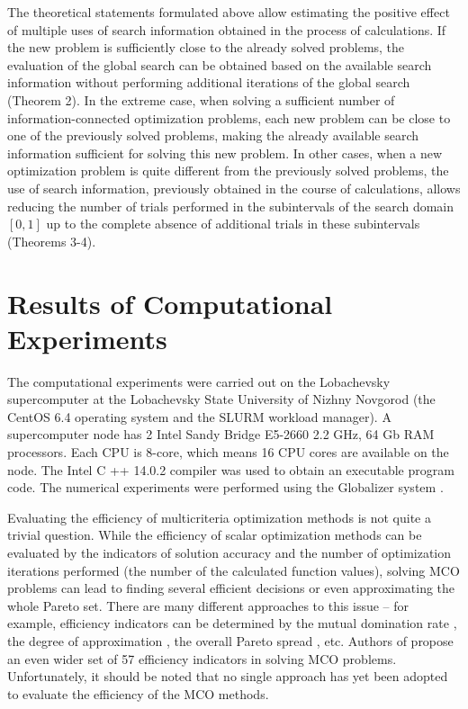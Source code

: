 \documentclass[smallextended]{svjour3}       %
\begin{document}
The theoretical statements formulated above allow estimating the positive effect of multiple uses of search information obtained in the process of calculations. If the new problem is sufficiently close to the already solved problems, the evaluation of the global search can be obtained based on the available search information without performing additional iterations of the global search (Theorem 2). In the extreme case, when solving a sufficient number of information-connected optimization problems, each new problem can be close to one of the previously solved problems, making the already available search information sufficient for solving this new problem. In other cases, when a new optimization problem is quite different from the previously solved problems, the use of search information, previously obtained in the course of calculations, allows reducing the number of trials performed in the subintervals of the search domain $[0,1]$ up to the complete absence of additional trials in these subintervals (Theorems 3-4).

\section{Results of Computational Experiments}
\label{sec:5}

The computational experiments were carried out on the Lobachevsky supercomputer at the Lobachevsky State University of Nizhny Novgorod (the CentOS 6.4 operating system and the SLURM workload manager). A supercomputer node has 2 Intel Sandy Bridge E5-2660 2.2 GHz, 64 Gb RAM processors. Each CPU is 8-core, which means 16 CPU cores are available on the node. The Intel C ++ 14.0.2 compiler was used to obtain an executable program code. The numerical experiments were performed using the Globalizer system \cite{c32}.

Evaluating the efficiency of multicriteria optimization methods is not quite a trivial question. While the efficiency of scalar optimization methods can be evaluated by the indicators of solution accuracy and the number of optimization iterations performed (the number of the calculated function values), solving MCO problems can lead to finding several efficient decisions or even approximating the whole Pareto set. There are many different approaches to this issue -- for example, efficiency indicators can be determined by the mutual domination rate \cite{c49}, the degree of approximation \cite{c50}, the overall Pareto spread \cite{c51}, etc. Authors of \cite{c52} propose an even wider set of 57 efficiency indicators in solving MCO problems. Unfortunately, it should be noted that no single approach has yet been adopted to evaluate the efficiency of the MCO methods. 
\end{document}

